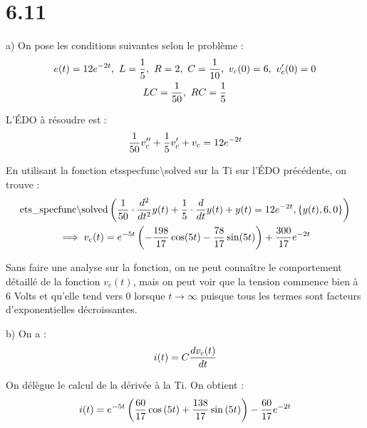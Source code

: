 \section*{6.11}

a) On pose les conditions suivantes selon le problème :
\begin{gather*}
    e(t) = 12 e^{-2t},\ L = \f{1}{5},\ R = 2,\ C = \f{1}{10},\ v_c(0)=6,\ v_c'(0)=0 \\
    LC = \f{1}{50},\ RC = \f{1}{5}
\end{gather*}

L'ÉDO à résoudre est :
\begin{align*}
    \dfrac{1}{50}v_c'' + \dfrac{1}{5}v_c' + v_c = 12 e^{-2t}
\end{align*}

En utilisant la fonction ets\textunderscore specfunc\textbackslash solved sur la Ti
sur l'ÉDO précédente, on trouve :
\begin{gather*}
    \operatorname{ets\_ specfunc\backslash solved} \left({\dfrac{1}{50}\cdot\dfrac{d ^2}{d t^2}y(t) + \dfrac{1}{5}\cdot\dfrac{d }{d t}y(t) + y(t)
    = 12 e^{-2t},\{y(t),6,0\}}\right) \\
    \implies v_c(t) = e^{-5t}\left({-\dfrac{198}{17}\cos(5t)-\dfrac{78}{17}\sin(5t)}\right)
    + \dfrac{300}{17}e^{-2t}
\end{gather*}

Sans faire une analyse sur la fonction, on ne peut connaître le comportement
détaillé de la fonction $v_c(t)$, mais on peut voir que la tension commence
bien à 6 Volts et qu'elle tend vers 0 lorsque $t\to\infty$ puisque tous les termes
sont facteurs d'exponentielles décroissantes.

\vspace{5mm}
b) On a :
\begin{align*}
    i(t) = C\dfrac{d v_c(t)}{d t}
\end{align*}

On délègue le calcul de la dérivée à la Ti. On obtient :
\begin{align*}
    i(t) = e^{-5t}\left({\dfrac{60}{17}\cos\left({5t}\right)+\dfrac{138}{17}\sin\left({5t}\right)}\right)
    -\dfrac{60}{17}e^{-2t}
\end{align*}

